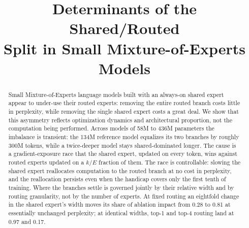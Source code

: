 \documentclass[conference,11pt]{IEEEtran}
\begin{document}
\title{Determinants of the Shared/Routed\\ Split in Small Mixture-of-Experts Models}

\author{
\and
{}
}

\maketitle
{}

\begin{abstract}
Small Mixture-of-Experts language models built with an always-on shared expert appear to
under-use their routed experts: removing the entire routed branch costs little in perplexity,
while removing the single shared expert costs a great deal. We show that this asymmetry reflects
optimization dynamics and architectural proportion, not the computation being performed. Across
models of 58M to 436M parameters the imbalance is transient: the 134M reference model equalizes
its two branches by roughly 300M tokens, while a twice-deeper model stays shared-dominated longer.
The cause is a gradient-exposure race that the shared expert, updated on every token, wins against
routed experts updated on a $k/E$ fraction of them. The race is controllable: slowing the shared
expert reallocates computation to the routed branch at no cost in perplexity, and the reallocation
persists even when the handicap covers only the first tenth of training. Where the branches settle
is governed jointly by their relative width and by routing granularity, not by the number of
experts. At fixed routing an eightfold change in the shared expert's width moves its share of
ablation impact from 0.28 to 0.81 at essentially unchanged perplexity; at identical widths, top-1
and top-4 routing land at 0.97 and 0.17.
\end{abstract}
\end{document}
